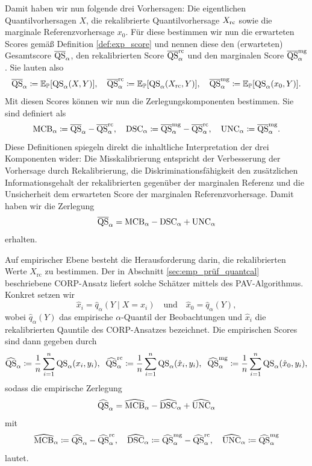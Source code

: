 Damit haben wir nun folgende drei Vorhersagen: Die eigentlichen Quantilvorhersagen $X$, die rekalibrierte Quantilvorhersage $X_{\mathrm{rc}}$ sowie die marginale Referenzvorhersage $x_0$. Für diese bestimmen wir nun die erwarteten Scores gemäß Definition \ref{def:exp_score} und nennen diese den (erwarteten) Gesamtscore $\overline{\mathrm{QS}}_\alpha$, den rekalibrierten Score $\overline{\mathrm{QS}}^{\mathrm{rc}}_\alpha$ und den marginalen Score $\overline{\mathrm{QS}}^{\mathrm{mg}}_\alpha$. Sie lauten also
\[
\overline{\mathrm{QS}}_\alpha \coloneqq \mathbb{E}_{\mathbb{P}}[\mathrm{QS}_\alpha(X,Y)], \quad
\overline{\mathrm{QS}}^{\mathrm{rc}}_\alpha \coloneqq \mathbb{E}_{\mathbb{P}}[\mathrm{QS}_\alpha(X_{\mathrm{rc}},Y)], \quad
\overline{\mathrm{QS}}^{\mathrm{mg}}_\alpha \coloneqq \mathbb{E}_{\mathbb{P}}[\mathrm{QS}_\alpha(x_0,Y)].
\]
Mit diesen Scores können wir nun die Zerlegungskomponenten bestimmen. Sie sind definiert als
\[
\mathrm{MCB}_\alpha \coloneqq \overline{\mathrm{QS}}_\alpha - \overline{\mathrm{QS}}^{\mathrm{rc}}_\alpha, \quad
\mathrm{DSC}_\alpha \coloneqq \overline{\mathrm{QS}}^{\mathrm{mg}}_\alpha - \overline{\mathrm{QS}}^{\mathrm{rc}}_\alpha, \quad
\mathrm{UNC}_\alpha \coloneqq \overline{\mathrm{QS}}^{\mathrm{mg}}_\alpha.
\]
Diese Definitionen spiegeln direkt die inhaltliche Interpretation der drei Komponenten wider: Die Misskalibrierung entspricht der Verbesserung der Vorhersage durch Rekalibrierung, die Diskriminationsfähigkeit den zusätzlichen Informationsgehalt der rekalibrierten gegenüber der marginalen Referenz und die Unsicherheit dem erwarteten Score der marginalen Referenzvorhersage.
Damit haben wir die Zerlegung
\[
\overline{\mathrm{QS}}_\alpha = \mathrm{MCB}_\alpha - \mathrm{DSC}_\alpha + \mathrm{UNC}_\alpha
\]
erhalten.

Auf empirischer Ebene besteht die Herausforderung darin, die rekalibrierten 
Werte $X_{\mathrm{rc}}$ zu bestimmen. Der in Abschnitt \ref{sec:emp_prüf_quantcal} beschriebene 
CORP-Ansatz liefert solche Schätzer mittels des PAV-Algorithmus. Konkret setzen 
wir
\[
\hat{x}_i = \hat{q}_\alpha(Y \mid X = x_i)
\quad \text{und} \quad
\hat{x}_0 = \hat{q}_\alpha(Y),
\]
wobei $\hat{q}_\alpha(Y)$ das empirische $\alpha$-Quantil der Beobachtungen 
und $\hat{x}_i$ die rekalibrierten Qauntile des CORP-Ansatzes bezeichnet. Die empirischen Scores sind dann gegeben durch
\begin{equation} \label{eq:decomp_qs_emp_scores}
\widehat{\mathrm{QS}}_\alpha \coloneqq \frac{1}{n}\sum_{i=1}^{n}\mathrm{QS}_\alpha(x_i,y_i), \;\;
\widehat{\mathrm{QS}}^{\mathrm{rc}}_\alpha \coloneqq \frac{1}{n}\sum_{i=1}^{n}\mathrm{QS}_\alpha(\hat{x}_i,y_i), \;\;
\widehat{\mathrm{QS}}^{\mathrm{mg}}_\alpha \coloneqq \frac{1}{n}\sum_{i=1}^{n}\mathrm{QS}_\alpha(\hat{x}_0,y_i),
\end{equation}
sodass die empirische Zerlegung
\[
\widehat{\mathrm{QS}}_\alpha = \widehat{\mathrm{MCB}}_\alpha - \widehat{\mathrm{DSC}}_\alpha + \widehat{\mathrm{UNC}}_\alpha
\]
mit
\[
\widehat{\mathrm{MCB}}_\alpha \coloneqq \widehat{\mathrm{QS}}_\alpha - \widehat{\mathrm{QS}}^{\mathrm{rc}}_\alpha, \quad
\widehat{\mathrm{DSC}}_\alpha \coloneqq \widehat{\mathrm{QS}}^{\mathrm{mg}}_\alpha - \widehat{\mathrm{QS}}^{\mathrm{rc}}_\alpha, \quad
\widehat{\mathrm{UNC}}_\alpha \coloneqq \widehat{\mathrm{QS}}^{\mathrm{mg}}_\alpha
\]
lautet. 

